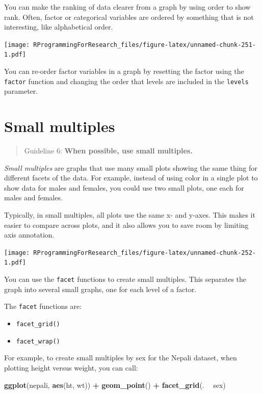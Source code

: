 \documentclass[]{book}
\makeatletter
\newenvironment{Shaded}{\begin{snugshade}}{\end{snugshade}}
\newcommand{\KeywordTok}[1]{\textcolor[rgb]{0.13,0.29,0.53}{\textbf{#1}}}
\newcommand{\StringTok}[1]{\textcolor[rgb]{0.31,0.60,0.02}{#1}}
\newcommand{\OperatorTok}[1]{\textcolor[rgb]{0.81,0.36,0.00}{\textbf{#1}}}
\newcommand{\NormalTok}[1]{#1}
\providecommand{\tightlist}{%
  \setlength{\itemsep}{0pt}\setlength{\parskip}{0pt}}
\newenvironment{kframe}{%
\medskip{}
\setlength{\fboxsep}{.8em}
 \def\at@end@of@kframe{}%
 \ifinner\ifhmode%
  \def\at@end@of@kframe{\end{minipage}}%
  \begin{minipage}{\columnwidth}%
 \fi\fi%
 \def\FrameCommand##1{\hskip\@totalleftmargin \hskip-\fboxsep
 \colorbox{shadecolor}{##1}\hskip-\fboxsep
     \hskip-\linewidth \hskip-\@totalleftmargin \hskip\columnwidth}%
 \MakeFramed {\advance\hsize-\width
   \@totalleftmargin\z@ \linewidth\hsize
   \@setminipage}}%
 {\par\unskip\endMakeFramed%
 \at@end@of@kframe}
\renewenvironment{Shaded}{\begin{kframe}}{\end{kframe}}
\theoremstyle{definition}
\theoremstyle{definition}
\theoremstyle{definition}
\theoremstyle{remark}
\makeatother
\begin{document}
You can make the ranking of data clearer from a graph by using order to
show rank. Often, factor or categorical variables are ordered by
something that is not interesting, like alphabetical order.

\texttt{[image: RProgrammingForResearch\_files/figure-latex/unnamed-chunk-251-1.pdf]}

You can re-order factor variables in a graph by resetting the factor
using the \texttt{factor} function and changing the order that levels
are included in the \texttt{levels} parameter.

\section{Small multiples}\label{small-multiples}

\begin{quote}
Guideline 6: \textbf{When possible, use small multiples.} \bigskip
\end{quote}

\emph{Small multiples} are graphs that use many small plots showing the
same thing for different facets of the data. For example, instead of
using color in a single plot to show data for males and females, you
could use two small plots, one each for males and females. \bigskip

Typically, in small multiples, all plots use the same x- and y-axes.
This makes it easier to compare across plots, and it also allows you to
save room by limiting axis annotation.

\texttt{[image: RProgrammingForResearch\_files/figure-latex/unnamed-chunk-252-1.pdf]}

You can use the \texttt{facet} functions to create small multiples. This
separates the graph into several small graphs, one for each level of a
factor. \bigskip

The \texttt{facet} functions are:

\begin{itemize}
\tightlist
\item
  \texttt{facet\_grid()}
\item
  \texttt{facet\_wrap()}
\end{itemize}

For example, to create small multiples by sex for the Nepali dataset,
when plotting height versus weight, you can call:

\begin{Shaded}
\begin{Highlighting}[]
\KeywordTok{ggplot}\NormalTok{(nepali, }\KeywordTok{aes}\NormalTok{(ht, wt)) }\OperatorTok{+}\StringTok{ }
\StringTok{        }\KeywordTok{geom_point}\NormalTok{() }\OperatorTok{+}\StringTok{ }
\StringTok{        }\KeywordTok{facet_grid}\NormalTok{(. }\OperatorTok{~}\StringTok{ }\NormalTok{sex)}
\end{Highlighting}
\end{Shaded}
\end{document}
